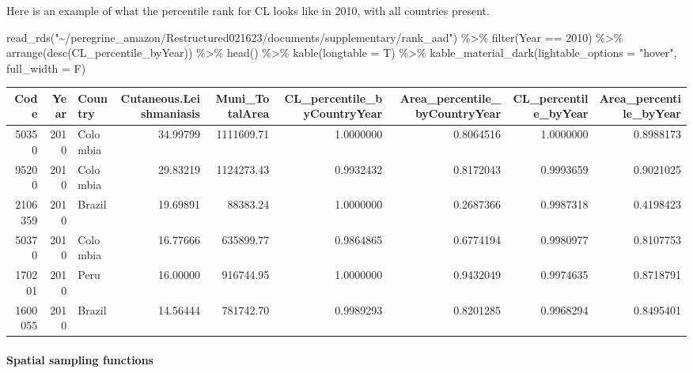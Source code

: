 \documentclass[
]{article}
\newenvironment{Shaded}{\begin{snugshade}}{\end{snugshade}}
\newcommand{\AttributeTok}[1]{\textcolor[rgb]{0.77,0.63,0.00}{#1}}
\newcommand{\DecValTok}[1]{\textcolor[rgb]{0.00,0.00,0.81}{#1}}
\newcommand{\FunctionTok}[1]{\textcolor[rgb]{0.00,0.00,0.00}{#1}}
\newcommand{\NormalTok}[1]{#1}
\newcommand{\SpecialCharTok}[1]{\textcolor[rgb]{0.00,0.00,0.00}{#1}}
\newcommand{\StringTok}[1]{\textcolor[rgb]{0.31,0.60,0.02}{#1}}
\begin{document}
Here is an example of what the percentile rank for CL looks like in
2010, with all countries present.

\begin{Shaded}
\begin{Highlighting}[]
\FunctionTok{read\_rds}\NormalTok{(}\StringTok{"\textasciitilde{}/peregrine\_amazon/Restructured021623/documents/supplementary/rank\_aad"}\NormalTok{) }\SpecialCharTok{\%\textgreater{}\%} 
  \FunctionTok{filter}\NormalTok{(Year }\SpecialCharTok{==} \DecValTok{2010}\NormalTok{) }\SpecialCharTok{\%\textgreater{}\%} 
  \FunctionTok{arrange}\NormalTok{(}\FunctionTok{desc}\NormalTok{(CL\_percentile\_byYear)) }\SpecialCharTok{\%\textgreater{}\%} 
  \FunctionTok{head}\NormalTok{() }\SpecialCharTok{\%\textgreater{}\%} 
  \FunctionTok{kable}\NormalTok{(}\AttributeTok{longtable =}\NormalTok{ T) }\SpecialCharTok{\%\textgreater{}\%} 
  \FunctionTok{kable\_material\_dark}\NormalTok{(}\AttributeTok{lightable\_options =} \StringTok{"hover"}\NormalTok{,}
                      \AttributeTok{full\_width =}\NormalTok{ F) }
\end{Highlighting}
\end{Shaded}

\begin{longtable}{r|r|l|r|r|r|r|r|r}
\hline
Code & Year & Country & Cutaneous.Leishmaniasis & Muni\_TotalArea & CL\_percentile\_byCountryYear & Area\_percentile\_byCountryYear & CL\_percentile\_byYear & Area\_percentile\_byYear\\
\hline
50350 & 2010 & Colombia & 34.99799 & 1111609.71 & 1.0000000 & 0.8064516 & 1.0000000 & 0.8988173\\
\hline
95200 & 2010 & Colombia & 29.83219 & 1124273.43 & 0.9932432 & 0.8172043 & 0.9993659 & 0.9021025\\
\hline
2106359 & 2010 & Brazil & 19.69891 & 88383.24 & 1.0000000 & 0.2687366 & 0.9987318 & 0.4198423\\
\hline
50370 & 2010 & Colombia & 16.77666 & 635899.77 & 0.9864865 & 0.6774194 & 0.9980977 & 0.8107753\\
\hline
170201 & 2010 & Peru & 16.00000 & 916744.95 & 1.0000000 & 0.9432049 & 0.9974635 & 0.8718791\\
\hline
1600055 & 2010 & Brazil & 14.56444 & 781742.70 & 0.9989293 & 0.8201285 & 0.9968294 & 0.8495401\\
\hline
\end{longtable}

\hypertarget{spatial-sampling-functions}{%
\paragraph{Spatial sampling
functions}\label{spatial-sampling-functions}}
\end{document}
